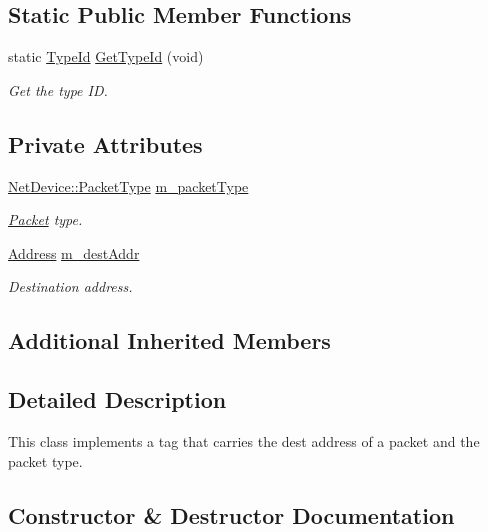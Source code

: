\subsection*{Static Public Member Functions}
\begin{DoxyCompactItemize}
\item 
static \hyperlink{classns3_1_1TypeId}{Type\+Id} \hyperlink{classns3_1_1PacketSocketTag_ab8a32737caa2730d29a04db9a1cf51fe}{Get\+Type\+Id} (void)
\begin{DoxyCompactList}\small\item\em Get the type ID. \end{DoxyCompactList}\end{DoxyCompactItemize}
\subsection*{Private Attributes}
\begin{DoxyCompactItemize}
\item 
\hyperlink{classns3_1_1NetDevice_ace65153f09144f55a0d3e702fc29d6b2}{Net\+Device\+::\+Packet\+Type} \hyperlink{classns3_1_1PacketSocketTag_a91dc92f154c3804f200f9913b3e0dda5}{m\+\_\+packet\+Type}
\begin{DoxyCompactList}\small\item\em \hyperlink{classns3_1_1Packet}{Packet} type. \end{DoxyCompactList}\item 
\hyperlink{classns3_1_1Address}{Address} \hyperlink{classns3_1_1PacketSocketTag_a1d4aa81ebe0c6ec44dc76f10d2e0a255}{m\+\_\+dest\+Addr}
\begin{DoxyCompactList}\small\item\em Destination address. \end{DoxyCompactList}\end{DoxyCompactItemize}
\subsection*{Additional Inherited Members}


\subsection{Detailed Description}
This class implements a tag that carries the dest address of a packet and the packet type. 

\subsection{Constructor \& Destructor Documentation}
